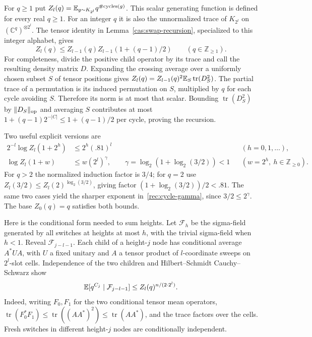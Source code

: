 For $q\ge1$ put
$Z_l(q)=\mathbb E_{g\sim K_{2^l}}q^{\#\mathrm{cycles}(g)}$.
This scalar generating function is defined for every real $q\ge1$.
For an integer $q$ it is also the unnormalized trace of $K_{2^l}$ on
$(\mathbb C^q)^{\otimes2^l}$.  The tensor identity in
Lemma~\ref{cas:swap-recursion}, specialized to this integer alphabet, gives
\begin{equation}\label{rec:cycle-trace-recursion}
 Z_l(q)\le Z_{l-1}(q)Z_{l-1}(1+(q-1)/2)
 \qquad(q\in\mathbb Z_{\ge1}).
\end{equation}
For completeness, divide the positive child operator by its trace and
call the resulting density matrix $D$.  Expanding the crossing average
over a uniformly chosen subset $S$ of tensor positions gives
$Z_l(q)=Z_{l-1}(q)^2\mathbb E_S\operatorname{tr}(D_S^2)$.
The partial trace of a permutation is its induced permutation on $S$,
multiplied by $q$ for each cycle avoiding $S$.  Therefore its norm is
at most that scalar.  Bounding $\operatorname{tr}(D_S^2)$ by
$\|D_S\|_{\mathrm{op}}$ and averaging $S$ contributes at most
$1+(q-1)2^{-|C|}\le1+(q-1)/2$ per cycle, proving the recursion.

Two useful explicit versions are
\begin{align}
 2^{-l}\log Z_l(1+2^h)&\le2^h(.81)^l
             &&(h=0,1,\ldots),\label{rec:cycle-081}\\
 \log Z_l(1+w)&\le w(2^l)^\gamma,\qquad
 \gamma=\log_2(1+\log_2(3/2))<1
             &&(w=2^h,\ h\in\mathbb Z_{\ge0}).\label{rec:cycle-gamma}
\end{align}
For $q>2$ the normalized induction factor is $3/4$; for $q=2$ use
$Z_l(3/2)\le Z_l(2)^{\log_2(3/2)}$, giving factor
$(1+\log_2(3/2))/2<.81$.  The same two cases yield the sharper
exponent in~\eqref{rec:cycle-gamma}, since $3/2\le2^\gamma$.
The base $Z_0(q)=q$ satisfies both bounds.

Here is the conditional form needed to sum heights.  Let $\mathcal F_h$ be the sigma-field generated by all switches
at heights at most $h$, with the trivial sigma-field when $h<1$.
Reveal $\mathcal F_{j-l-1}$.  Each child of a height-$j$ node has conditional
average $A^*UA$, with $U$ a fixed unitary and $A$ a tensor product of
$l$-coordinate sweeps on $2^l$-slot cells.  Independence of the two
children and Hilbert--Schmidt Cauchy--Schwarz show
\begin{equation}\label{rec:conditional-cycle-trace}
 \mathbb E[q^{C_j}\mid\mathcal F_{j-l-1}]
      \le Z_l(q)^{n/(2\cdot2^l)}.
\end{equation}
Indeed, writing $F_0,F_1$ for the two conditional tensor mean
operators, $\operatorname{tr}(F_0^*F_1)\le\operatorname{tr}((AA^*)^2)
\le\operatorname{tr}(AA^*)$, and the trace factors over the cells.
Fresh switches in different height-$j$ nodes are conditionally independent.

